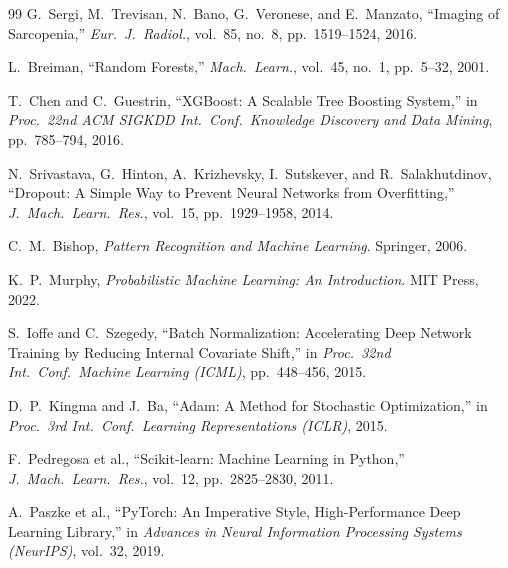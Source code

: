 \documentclass[12pt, a4paper, oneside]{report}
\begin{document}
\begin{thebibliography}{99}
G.~Sergi, M.~Trevisan, N.~Bano, G.~Veronese, and E.~Manzato,
``Imaging of Sarcopenia,''
\emph{Eur.\ J.\ Radiol.}, vol.~85, no.~8, pp.~1519--1524, 2016.

L.~Breiman,
``Random Forests,''
\emph{Mach.\ Learn.}, vol.~45, no.~1, pp.~5--32, 2001.

T.~Chen and C.~Guestrin,
``XGBoost: A Scalable Tree Boosting System,''
in \emph{Proc.\ 22nd ACM SIGKDD Int.\ Conf.\ Knowledge Discovery and Data Mining}, pp.~785--794, 2016.

N.~Srivastava, G.~Hinton, A.~Krizhevsky, I.~Sutskever, and R.~Salakhutdinov,
``Dropout: A Simple Way to Prevent Neural Networks from Overfitting,''
\emph{J.\ Mach.\ Learn.\ Res.}, vol.~15, pp.~1929--1958, 2014.

C.~M.~Bishop,
\emph{Pattern Recognition and Machine Learning}.
Springer, 2006.

K.~P.~Murphy,
\emph{Probabilistic Machine Learning: An Introduction}.
MIT Press, 2022.

S.~Ioffe and C.~Szegedy,
``Batch Normalization: Accelerating Deep Network Training by Reducing Internal Covariate Shift,''
in \emph{Proc.\ 32nd Int.\ Conf.\ Machine Learning (ICML)}, pp.~448--456, 2015.

D.~P.~Kingma and J.~Ba,
``Adam: A Method for Stochastic Optimization,''
in \emph{Proc.\ 3rd Int.\ Conf.\ Learning Representations (ICLR)}, 2015.

F.~Pedregosa et al.,
``Scikit-learn: Machine Learning in Python,''
\emph{J.\ Mach.\ Learn.\ Res.}, vol.~12, pp.~2825--2830, 2011.

A.~Paszke et al.,
``PyTorch: An Imperative Style, High-Performance Deep Learning Library,''
in \emph{Advances in Neural Information Processing Systems (NeurIPS)}, vol.~32, 2019.

\end{thebibliography}
\end{document}
